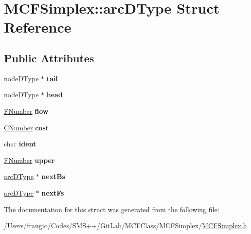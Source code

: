 \hypertarget{struct_m_c_f_simplex_1_1arc_d_type}{}\section{M\+C\+F\+Simplex\+:\+:arc\+D\+Type Struct Reference}
\label{struct_m_c_f_simplex_1_1arc_d_type}
\subsection*{Public Attributes}
\begin{DoxyCompactItemize}
\item 
\mbox{\label{struct_m_c_f_simplex_1_1arc_d_type_a2db0c8877cc74c81aeb32db574dc9d5e}} 
\mbox{\hyperlink{struct_m_c_f_simplex_1_1node_d_type}{node\+D\+Type}} $\ast$ {\bfseries tail}
\item 
\mbox{\label{struct_m_c_f_simplex_1_1arc_d_type_a64d451c072c2ec95485f0a043d1f7eb6}} 
\mbox{\hyperlink{struct_m_c_f_simplex_1_1node_d_type}{node\+D\+Type}} $\ast$ {\bfseries head}
\item 
\mbox{\label{struct_m_c_f_simplex_1_1arc_d_type_ad3a232f7afd015905a9023b2e3f2180b}} 
\mbox{\hyperlink{class_m_c_f_class_aeea3e5951d222b2a8e57de1b4246a909}{F\+Number}} {\bfseries flow}
\item 
\mbox{\label{struct_m_c_f_simplex_1_1arc_d_type_a77314dc0447f6b3c87d85436b242aa4b}} 
\mbox{\hyperlink{class_m_c_f_class_a24d0627ba8213afe1ec4ebeb4508e8f1}{C\+Number}} {\bfseries cost}
\item 
\mbox{\label{struct_m_c_f_simplex_1_1arc_d_type_aad21f39e6140cc7d4402bcb9295c67d8}} 
char {\bfseries ident}
\item 
\mbox{\label{struct_m_c_f_simplex_1_1arc_d_type_a226bb8b0131b2d6e7c1f9cf000b2fa22}} 
\mbox{\hyperlink{class_m_c_f_class_aeea3e5951d222b2a8e57de1b4246a909}{F\+Number}} {\bfseries upper}
\item 
\mbox{\label{struct_m_c_f_simplex_1_1arc_d_type_aea003142ee0e84583df82f557ccbb42f}} 
\mbox{\hyperlink{struct_m_c_f_simplex_1_1arc_d_type}{arc\+D\+Type}} $\ast$ {\bfseries next\+Bs}
\item 
\mbox{\label{struct_m_c_f_simplex_1_1arc_d_type_afa0bede2fee832ef5890911924d1ea16}} 
\mbox{\hyperlink{struct_m_c_f_simplex_1_1arc_d_type}{arc\+D\+Type}} $\ast$ {\bfseries next\+Fs}
\end{DoxyCompactItemize}


The documentation for this struct was generated from the following file\+:\begin{DoxyCompactItemize}
\item 
/\+Users/frangio/\+Codes/\+S\+M\+S++/\+Git\+Lab/\+M\+C\+F\+Class/\+M\+C\+F\+Simplex/\mbox{\hyperlink{_m_c_f_simplex_8h}{M\+C\+F\+Simplex.\+h}}\end{DoxyCompactItemize}
